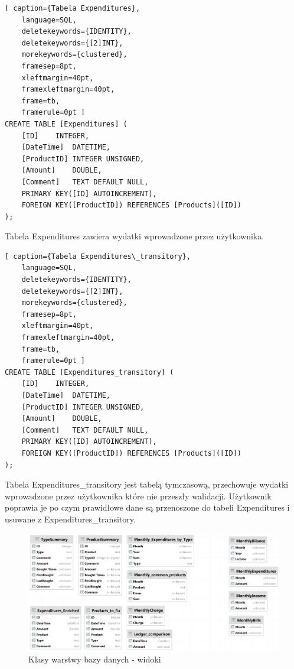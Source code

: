 \documentclass[a4paper,10pt, twoside]{report}
\begin{document}
\begin{minipage}{\textwidth}
\begin{lstlisting}[ caption={Tabela Expenditures},
    language=SQL,
    deletekeywords={IDENTITY},
    deletekeywords={[2]INT},
    morekeywords={clustered},
    framesep=8pt,
    xleftmargin=40pt,
    framexleftmargin=40pt,
    frame=tb,
    framerule=0pt ]
CREATE TABLE [Expenditures] (
	[ID]	INTEGER,
	[DateTime]	DATETIME,
	[ProductID]	INTEGER UNSIGNED,
	[Amount]	DOUBLE,
	[Comment]	TEXT DEFAULT NULL,
	PRIMARY KEY([ID] AUTOINCREMENT),
	FOREIGN KEY([ProductID]) REFERENCES [Products]([ID])
);
\end{lstlisting}
{Tabela Expenditures zawiera wydatki wprowadzone przez użytkownika.}
\end{minipage}

\begin{minipage}{\textwidth}
\begin{lstlisting}[ caption={Tabela Expenditures\_transitory},
    language=SQL,
    deletekeywords={IDENTITY},
    deletekeywords={[2]INT},
    morekeywords={clustered},
    framesep=8pt,
    xleftmargin=40pt,
    framexleftmargin=40pt,
    frame=tb,
    framerule=0pt ]
CREATE TABLE [Expenditures_transitory] (
	[ID]	INTEGER,
	[DateTime]	DATETIME,
	[ProductID]	INTEGER UNSIGNED,
	[Amount]	DOUBLE,
	[Comment]	TEXT DEFAULT NULL,
	PRIMARY KEY([ID] AUTOINCREMENT),
	FOREIGN KEY([ProductID]) REFERENCES [Products]([ID])
);
\end{lstlisting}
{Tabela Expenditures\_transitory jest tabelą tymczasową, przechowuje wydatki 
wprowadzone przez użytkownika które nie przeszły walidacji. Użytkownik poprawia 
je po czym prawidłowe dane są przenoszone do tabeli Expenditures i  usuwane z 
Expenditures\_transitory.}
\end{minipage}



\begin{figure}[H]           %
    \caption{Klasy warstwy bazy danych - widoki}
    \label{fig:Klasy warstwy bazy danych - widoki}
    \centering  
    \includegraphics[width=12cm]{figures/Budgeter_Finances-db_Views_DataGrid.png}
\end{figure}
\end{document}
